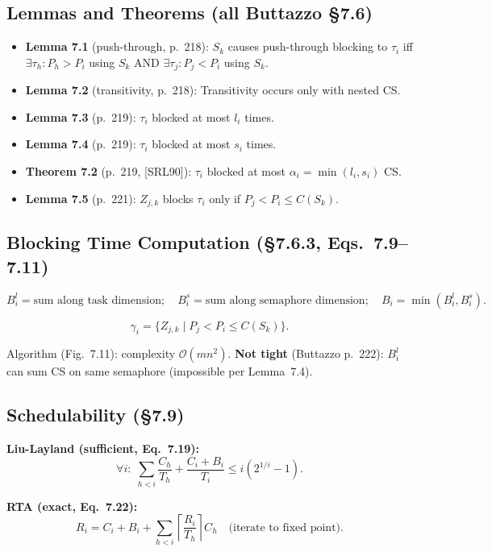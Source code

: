 \documentclass[conference,onecolumn]{IEEEtran}
\begin{document}
\subsection{Lemmas and Theorems (all Buttazzo \S7.6)}
\begin{itemize}
  \item \textbf{Lemma 7.1} (push-through, p.~218): $S_k$ causes push-through
        blocking to $\tau_i$ iff $\exists\tau_h: P_h > P_i$ using $S_k$
        AND $\exists\tau_j: P_j < P_i$ using $S_k$.
  \item \textbf{Lemma 7.2} (transitivity, p.~218): Transitivity occurs
        only with nested CS.
  \item \textbf{Lemma 7.3} (p.~219): $\tau_i$ blocked at most $l_i$ times.
  \item \textbf{Lemma 7.4} (p.~219): $\tau_i$ blocked at most $s_i$ times.
  \item \textbf{Theorem 7.2} (p.~219, [SRL90]): $\tau_i$ blocked at most
        $\alpha_i = \min(l_i, s_i)$ CS.
  \item \textbf{Lemma 7.5} (p.~221): $Z_{j,k}$ blocks $\tau_i$ only if
        $P_j < P_i \leq C(S_k)$.
\end{itemize}

\subsection{Blocking Time Computation (\S7.6.3, Eqs.~7.9--7.11)}

\[
  B_i^l = \text{sum along task dimension};\quad
  B_i^s = \text{sum along semaphore dimension};\quad
  B_i = \min(B_i^l, B_i^s).
\]

\[
  \gamma_i = \{Z_{j,k} \mid P_j < P_i \leq C(S_k)\}.
\]

Algorithm (Fig.~7.11): complexity $\mathcal{O}(mn^2)$.
\textbf{Not tight} (Buttazzo p.~222): $B_i^l$ can sum CS on same
semaphore (impossible per Lemma~7.4).

\subsection{Schedulability (\S7.9)}

\textbf{Liu-Layland (sufficient, Eq.~7.19):}
\[
  \forall i:\;\sum_{h<i}\frac{C_h}{T_h} + \frac{C_i+B_i}{T_i} \leq i\!\left(2^{1/i}-1\right).
\]

\textbf{RTA (exact, Eq.~7.22):}
\[
  R_i = C_i + B_i + \sum_{h<i}\!\left\lceil\frac{R_i}{T_h}\right\rceil C_h
  \quad\text{(iterate to fixed point)}.
\]
\end{document}
